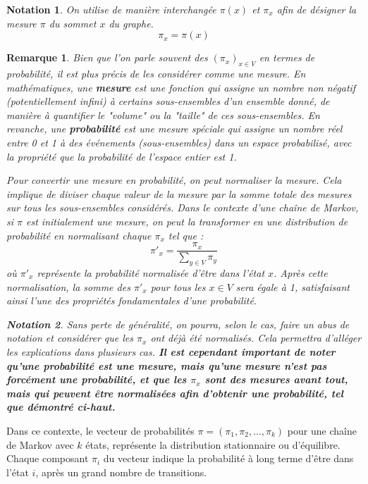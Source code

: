 \documentclass{article}
\theoremstyle{pasdepoint}
\theoremstyle{break}
\theoremstyle{pasdepoint}
\newtheorem*{remark}{Remarque}
\newtheorem*{notation}{Notation}
\begin{document}
\begin{notation}
    On utilise de manière interchangée \(\pi(x)\) et \(\pi_x\) afin de désigner la mesure \(\pi\) du sommet \(x\) du graphe.
    \[
        \pi_x = \pi(x)
    \]
\end{notation}
\begin{remark}
    Bien que l'on parle souvent des \((\pi_x)_{x \in V}\) en termes de probabilité, il est plus précis de les considérer comme une mesure. En mathématiques, une \textbf{mesure} est une fonction qui assigne un nombre non négatif (potentiellement infini) à certains sous-ensembles d'un ensemble donné, de manière à quantifier le "volume" ou la "taille" de ces sous-ensembles. En revanche, une \textbf{probabilité} est une mesure spéciale qui assigne un nombre réel entre 0 et 1 à des événements (sous-ensembles) dans un espace probabilisé, avec la propriété que la probabilité de l'espace entier est 1.
    
    Pour convertir une mesure en probabilité, on peut normaliser la mesure. Cela implique de diviser chaque valeur de la mesure par la somme totale des mesures sur tous les sous-ensembles considérés. Dans le contexte d'une chaîne de Markov, si \(\pi\) est initialement une mesure, on peut la transformer en une distribution de probabilité en normalisant chaque \(\pi_x\) tel que :
    \[
    \pi'_x = \frac{\pi_x}{\sum_{y \in V} \pi_y}
    \]
    où \(\pi'_x\) représente la probabilité normalisée d'être dans l'état \(x\). Après cette normalisation, la somme des \(\pi'_x\) pour tous les \(x \in V\) sera égale à 1, satisfaisant ainsi l'une des propriétés fondamentales d'une probabilité.
    \begin{notation}
        Sans perte de généralité, on pourra, selon le cas, faire un abus de notation et considérer que les \(\pi_x\) ont déjà été normalisés. Cela permettra d'alléger les explications dans plusieurs cas. \textbf{Il est cependant important de noter qu'une probabilité est une mesure, mais qu'une mesure n'est pas forcément une probabilité, et que les \(\pi_x\) sont des mesures avant tout, mais qui peuvent être normalisées afin d'obtenir une probabilité, tel que démontré ci-haut.}
    \end{notation}
\end{remark}
Dans ce contexte, le vecteur de probabilités \(\pi = (\pi_1, \pi_2, ..., \pi_k)\) pour une chaîne de Markov avec \(k\) états, représente la distribution stationnaire ou d'équilibre. Chaque composant \(\pi_i\) du vecteur indique la probabilité à long terme d'être dans l'état \(i\), après un grand nombre de transitions.
\end{document}
